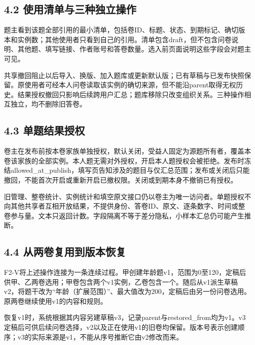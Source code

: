 \subsection{4.2 使用清单与三种独立操作}\label{ux4f7fux7528ux6e05ux5355ux4e0eux4e09ux79cdux72ecux7acbux64cdux4f5c}

题主看到该题全部引用的最小清单，包括卷ID、标题、状态、到期标记、确切版本和实例数；其他使用者只看到自己的引用。清单包含draft，但不包含问卷说明、其他题、填写链接、作者账号和答卷数量。选入前页面说明这些字段会对题主可见。

共享撤回阻止以后导入、换版、加入题库或更新默认版；已有草稿与已发布快照保留。原使用者可经本人问卷读取该实例的确切来源，但不能沿parent取得无权历史。结果授权撤回只影响后续跨用户汇总；题库移除只改变组织关系。三种操作相互独立，均不删除旧答卷。

\subsection{4.3 单题结果授权}\label{ux5355ux9898ux7ed3ux679cux6388ux6743}

卷主在发布前按本卷家族单独授权，默认关闭，受益人固定为源题所有者，覆盖本卷该家族的全部实例。本人题无需对外授权，开启本人题授权会被拒绝。发布时冻结allowed\_at\_publish，填写页告知涉及的题目与仅汇总范围；发布或关闭后只能撤回，不能首次开启或重新开启已撤权限。关闭或到期本身不撤销已有授权。

旧管理、整卷统计、实例统计和填空原文接口仍以卷主为唯一访问者。单题授权不向其他共享者互相开放结果，不提供身份、答卷ID、原文、逐条数字、时间或整卷参与量。文本只返回计数。字段隔离不等于差分隐私，小样本汇总仍可能产生推断。

\subsection{4.4 从两卷复用到版本恢复}\label{ux4eceux4e24ux5377ux590dux7528ux5230ux7248ux672cux6062ux590d}

F2-V将上述操作连接为一条连续过程。甲创建年龄题v1，范围为0至120，定稿后供甲、乙两卷选用；甲卷包含两个v1实例，乙卷包含一个。随后从v1派生草稿v2，将题干改为``年龄（扩展范围）''、最大值改为200，定稿后由另一份问卷选用。原两卷继续使用v1的内容和规则。

恢复v1时，系统根据其内容另建草稿v3，记录parent与restored\_from均为v1。v3定稿后可供后续问卷选择，v2以及正在使用v1的旧卷均保留。版本号表示创建顺序；v3的实际来源是v1，不能从序号推断它由v2修改而来。

